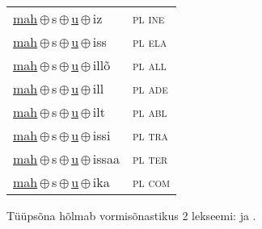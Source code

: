 \begin{minipage}{\textwidth}
\begin{sideways}
\begin{tabular}{l l}
\underline{mah}\,$\oplus$\,s\,$\oplus$\,\underline{u}\,$\oplus$\,iz & \textsc{ pl ine } \\
\underline{mah}\,$\oplus$\,s\,$\oplus$\,\underline{u}\,$\oplus$\,iss & \textsc{ pl ela } \\
\underline{mah}\,$\oplus$\,s\,$\oplus$\,\underline{u}\,$\oplus$\,illõ & \textsc{ pl all } \\
\underline{mah}\,$\oplus$\,s\,$\oplus$\,\underline{u}\,$\oplus$\,ill & \textsc{ pl ade } \\
\underline{mah}\,$\oplus$\,s\,$\oplus$\,\underline{u}\,$\oplus$\,ilt & \textsc{ pl abl } \\
\underline{mah}\,$\oplus$\,s\,$\oplus$\,\underline{u}\,$\oplus$\,issi & \textsc{ pl tra } \\
\underline{mah}\,$\oplus$\,s\,$\oplus$\,\underline{u}\,$\oplus$\,issaa & \textsc{ pl ter } \\
\underline{mah}\,$\oplus$\,s\,$\oplus$\,\underline{u}\,$\oplus$\,ika & \textsc{ pl com } \\
\end{tabular}
\end{sideways}
\label{tab:tüüpsõnamall-mahsu}

\end{minipage}

 
\vspace{1em}
\noindent Tüüpsõna hõlmab vormisõnastikus 2 lekseemi:  ja .
